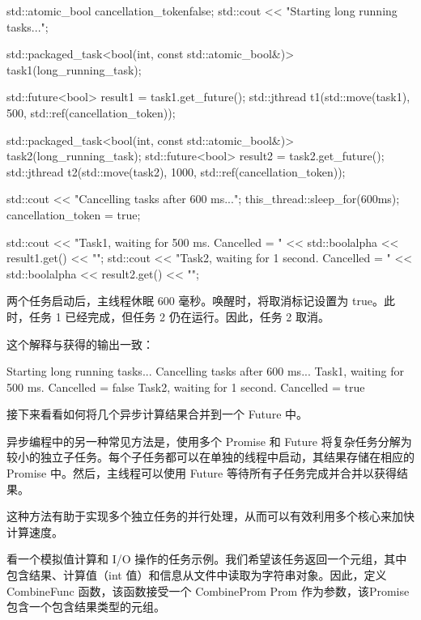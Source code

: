 \begin{cpp}
std::atomic_bool cancellation_token{false};
std::cout << "Starting long running tasks...\n";

std::packaged_task<bool(int, const std::atomic_bool&)>
                task1(long_running_task);

std::future<bool> result1 = task1.get_future();
std::jthread t1(std::move(task1), 500,
                std::ref(cancellation_token));

std::packaged_task<bool(int, const std::atomic_bool&)>
                task2(long_running_task);
std::future<bool> result2 = task2.get_future();
std::jthread t2(std::move(task2), 1000,
                std::ref(cancellation_token));

std::cout << "Cancelling tasks after 600 ms...\n";
this_thread::sleep_for(600ms);
cancellation_token = true;

std::cout << "Task1, waiting for 500 ms. Cancelled = "
          << std::boolalpha << result1.get() << "\n";
std::cout << "Task2, waiting for 1 second. Cancelled = "
          << std::boolalpha << result2.get() << "\n";
\end{cpp}

两个任务启动后，主线程休眠 600 毫秒。唤醒时，将取消标记设置为 true。此时，任务 1 已经完成，但任务 2 仍在运行。因此，任务 2 取消。

这个解释与获得的输出一致：

\begin{shell}
Starting long running tasks...
Cancelling tasks after 600 ms...
Task1, waiting for 500 ms. Cancelled = false
Task2, waiting for 1 second. Cancelled = true
\end{shell}

接下来看看如何将几个异步计算结果合并到一个 Future 中。


异步编程中的另一种常见方法是，使用多个 Promise 和 Future 将复杂任务分解为较小的独立子任务。每个子任务都可以在单独的线程中启动，其结果存储在相应的 Promise 中。然后，主线程可以使用 Future 等待所有子任务完成并合并以获得结果。

这种方法有助于实现多个独立任务的并行处理，从而可以有效利用多个核心来加快计算速度。

看一个模拟值计算和 I/O 操作的任务示例。我们希望该任务返回一个元组，其中包含结果、计算值（int 值）和信息从文件中读取为字符串对象。因此，定义 CombineFunc 函数，该函数接受一个 CombineProm Prom 作为参数，该Promise包含一个包含结果类型的元组。

